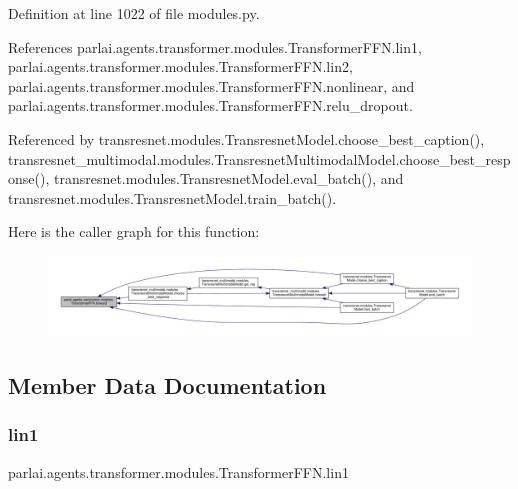 Definition at line 1022 of file modules.\+py.



References parlai.\+agents.\+transformer.\+modules.\+Transformer\+F\+F\+N.\+lin1, parlai.\+agents.\+transformer.\+modules.\+Transformer\+F\+F\+N.\+lin2, parlai.\+agents.\+transformer.\+modules.\+Transformer\+F\+F\+N.\+nonlinear, and parlai.\+agents.\+transformer.\+modules.\+Transformer\+F\+F\+N.\+relu\+\_\+dropout.



Referenced by transresnet.\+modules.\+Transresnet\+Model.\+choose\+\_\+best\+\_\+caption(), transresnet\+\_\+multimodal.\+modules.\+Transresnet\+Multimodal\+Model.\+choose\+\_\+best\+\_\+response(), transresnet.\+modules.\+Transresnet\+Model.\+eval\+\_\+batch(), and transresnet.\+modules.\+Transresnet\+Model.\+train\+\_\+batch().

Here is the caller graph for this function\+:
\nopagebreak
\begin{figure}[H]
\begin{center}
\leavevmode
\includegraphics[width=350pt]{classparlai_1_1agents_1_1transformer_1_1modules_1_1TransformerFFN_a54f8d1ec7c0c4228f78a3be843ab3003_icgraph}
\end{center}
\end{figure}


\subsection{Member Data Documentation}
\mbox{\label{classparlai_1_1agents_1_1transformer_1_1modules_1_1TransformerFFN_addc959c81b7c0ba87a47415af7f07e16}} 
\subsubsection{\texorpdfstring{lin1}{lin1}}
{\footnotesize\ttfamily parlai.\+agents.\+transformer.\+modules.\+Transformer\+F\+F\+N.\+lin1}



